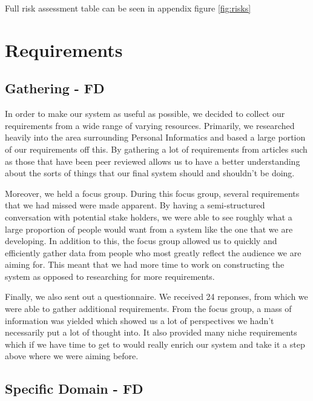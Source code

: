 \documentclass[10pt]{report}
\begin{document}
Full risk assessment table can be seen in appendix figure \ref{fig:risks}

\chapter{Requirements}

\section{Gathering - FD}

In order to make our system as useful as possible, we decided to collect our requirements from a wide range of varying resources. Primarily, we researched heavily into the area surrounding Personal Informatics and based a large portion of our requirements off this. By gathering a lot of requirements from articles such as those that have been peer reviewed allows us to have a better understanding about the sorts of things that our final system should and shouldn’t be doing.

Moreover, we held a focus group. During this focus group, several requirements that we had missed were made apparent. By having a semi-structured conversation with potential stake holders, we were able to see roughly what a large proportion of people would want from a system like the one that we are developing. In addition to this, the focus group allowed us to quickly and efficiently gather data from people who most greatly reflect the audience we are aiming for. This meant that we had more time to work on constructing the system as opposed to researching for more requirements.

Finally, we also sent out a questionnaire. We received 24 reponses, from which we were able to gather additional requirements. From the focus group, a mass of information was yielded which showed us a lot of perspectives we hadn’t necessarily put a lot of thought into. It also provided many niche requirements which if we have time to get to would really enrich our system and take it a step above where we were aiming before.

\section{Specific Domain -  FD}
\end{document}
